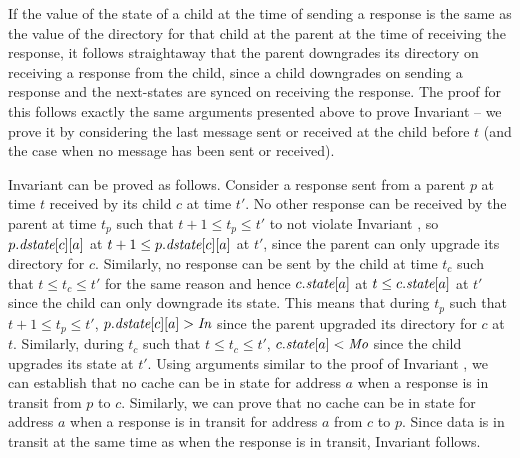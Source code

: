 If the value of the state of a child at the time of sending a response is the
same as the value of the directory for that child at the parent at the time of
receiving the response, it follows straightaway that the parent downgrades its
directory on receiving a response from the child, since a child downgrades on
sending a response and the next-states are synced on receiving the response.
The proof for this follows exactly the same arguments presented above to prove
Invariant  -- we prove it by considering the last message
sent or received at the child before $t$ (and the case when no message has been
sent or received).

Invariant  can be proved as follows. Consider a response
sent from a parent $p$ at time $t$ received by its child $c$ at time $t'$. No
other response can be received by the parent at time $t_p$ such that $t+1 \le
t_p \le t'$ to not violate Invariant , so $p.\textit{dstate}[c][a]$ at
$t+1 \le p.\textit{dstate}[c][a]$ at $t'$, since the parent can only upgrade its
directory for $c$. Similarly, no response can be sent by the child at time
$t_c$ such that $t \le t_c \le t'$ for the same reason and hence $c.\textit{state}[a]$
at $t \le c.\textit{state}[a]$ at $t'$ since the child can only downgrade its state.
This means that during $t_p$ such that $t+1 \le t_p \le t'$, $p.\textit{dstate}[c][a]
> \textit{In}$ since the parent upgraded its directory for $c$ at $t$. Similarly,
during $t_c$ such that $t \le t_c \le t'$, $c.\textit{state}[a] < \textit{Mo}$ since the
child upgrades its state at $t'$. Using arguments similar to the proof of
Invariant , we can establish that no cache can be in \Mo{}
state for address $a$ when a response is in transit from $p$ to $c$.
Similarly, we can prove that no cache can be in \Mo{} state for address $a$
when a response is in transit for address $a$ from $c$ to $p$. Since data is in
transit at the same time as when the response is in transit, Invariant
 follows.

